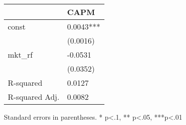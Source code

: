 \begin{table}
\caption{}
\label{}
\begin{center}
\begin{tabular}{ll}
\hline
               & CAPM       \\
\hline
const          & 0.0043***  \\
               & (0.0016)   \\
mkt\_rf        & -0.0531    \\
               & (0.0352)   \\
R-squared      & 0.0127     \\
R-squared Adj. & 0.0082     \\
\hline
\end{tabular}
\end{center}
\end{table}
\bigskip
Standard errors in parentheses. \newline 
* p<.1, ** p<.05, ***p<.01
